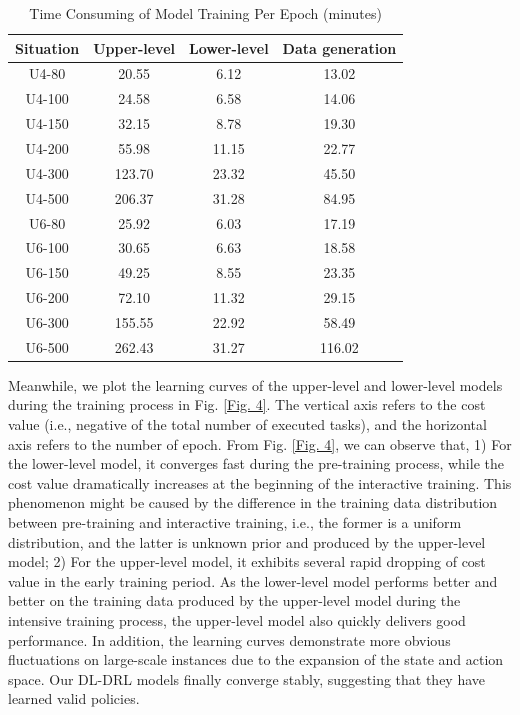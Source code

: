 \documentclass[lettersize,journal]{IEEEtran}
\begin{document}
	\begin{table}[!ht]
		\vspace{-.5pc}
		\renewcommand\arraystretch{1.2}
		\centering
		\caption{Time Consuming of Model Training Per Epoch (minutes)}
		\begin{tabular}{cccc}
			\toprule
			Situation & Upper-level & Lower-level & Data generation \\ \midrule
			U4-80 & 20.55 & 6.12  & 13.02  \\
			U4-100 & 24.58  & 6.58  & 14.06  \\
			U4-150 & 32.15  & 8.78  & 19.30  \\ 
			U4-200 & 55.98  & 11.15  & 22.77  \\
			U4-300 & 123.70 & 23.32 & 45.50 \\ 
			U4-500 & 206.37 & 31.28 & 84.95 \\ \midrule
			U6-80 & 25.92 & 6.03 & 17.19 \\ 
			U6-100 & 30.65 & 6.63 & 18.58 \\ 
			U6-150 & 49.25 & 8.55  & 23.35  \\ 
			U6-200 & 72.10  & 11.32  & 29.15  \\
			U6-300 & 155.55 & 22.92 & 58.49 \\ 
			U6-500 & 262.43 & 31.27 & 116.02 \\ \bottomrule
		\end{tabular}
		\label{Table 1}
	\end{table}
	
	Meanwhile, we plot the learning curves of the upper-level and lower-level models during the training process in Fig. \ref{Fig. 4}. The vertical axis refers to the cost value (i.e., negative of the total number of executed tasks), and the horizontal axis refers to the number of epoch. From Fig. \ref{Fig. 4}, we can observe that, 1) For the lower-level model, it converges fast during the pre-training process, while the cost value dramatically increases at the beginning of the interactive training. This phenomenon might be caused by the difference in the training data distribution between pre-training and interactive training, i.e., the former is a uniform distribution, and the latter is unknown prior and produced by the upper-level model; 2) For the upper-level model, it exhibits several rapid dropping of cost value in the early training period. As the lower-level model performs better and better on the training data produced by the upper-level model during the intensive training process, the upper-level model also quickly delivers good performance. In addition, the learning curves demonstrate more obvious fluctuations on large-scale instances due to the expansion of the state and action space. Our DL-DRL models finally converge stably, suggesting that they have learned valid policies.
	
\end{document}
